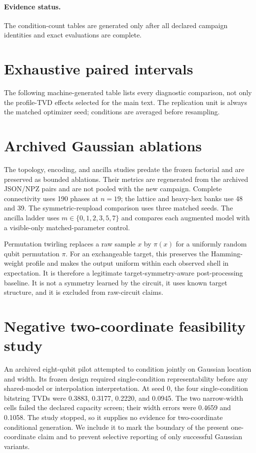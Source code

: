 \paragraph{Evidence status.}
The condition-count tables are generated only after all declared campaign
identities and exact evaluations are complete.

\fi

\section{Exhaustive paired intervals}

The following machine-generated table lists every diagnostic comparison, not
only the profile-TVD effects selected for the main text.  The replication unit
is always the matched optimizer seed; conditions are averaged before
resampling.

\clearpage

\section{Archived Gaussian ablations}
\label{app:ablations}

The topology, encoding, and ancilla studies predate the frozen factorial and
are preserved as bounded ablations.  Their metrics are regenerated from the
archived JSON/NPZ pairs and are not pooled with the new campaign.  Complete
connectivity uses 190 phases at $n=19$; the lattice and heavy-hex banks use 48
and 39.  The symmetric-reupload comparison uses three matched seeds.  The
ancilla ladder uses $m\in\{0,1,2,3,5,7\}$ and compares each augmented model
with a visible-only matched-parameter control.

Permutation twirling replaces a raw sample $x$ by $\pi(x)$ for a uniformly
random qubit permutation $\pi$.  For an exchangeable target, this preserves
the Hamming-weight profile and makes the output uniform within each observed
shell in expectation.  It is therefore a legitimate target-symmetry-aware
post-processing baseline.  It is not a symmetry learned by the circuit, it
uses known target structure, and it is excluded from raw-circuit claims.

\section{Negative two-coordinate feasibility study}
\label{app:negative-width}

An archived eight-qubit pilot attempted to condition jointly on Gaussian
location and width.  Its frozen design required single-condition
representability before any shared-model or interpolation interpretation.  At
seed 0, the four single-condition bitstring TVDs were 0.3883, 0.3177, 0.2220,
and 0.0945.  The two narrow-width cells failed the declared capacity screen;
their width errors were 0.4659 and 0.1058.  The study stopped, so it supplies
no evidence for two-coordinate conditional generation.  We include it to mark
the boundary of the present one-coordinate claim and to prevent selective
reporting of only successful Gaussian variants.

